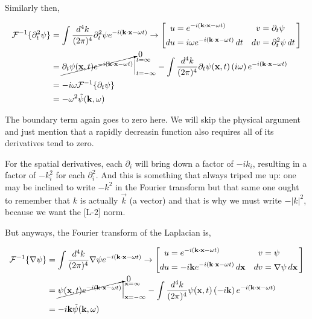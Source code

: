 Similarly then,

\begin{align*}
\mathcal{F}^{-1}\{ \partial_{t}^2 \psi \} &=
    \int \frac{d^4k}{(2\pi)^4} \partial_{t}^{2} \psi e^{-i(\boldsymbol{\mathbf{k}}\cdot\boldsymbol{\mathbf{x}} - \omega t)}
\rightarrow
\left[
    \begin{alignedat}{2}
        u  &= e^{-i(\boldsymbol{\mathbf{k}}\cdot\boldsymbol{\mathbf{x}} - \omega t)}                \quad & v  &= \partial_t \psi \\
        du &= i\omega e^{-i(\boldsymbol{\mathbf{k}}\cdot\boldsymbol{\mathbf{x}} - \omega t)} \, dt  \quad & dv &= \partial_{t}^{2} \psi \, dt
    \end{alignedat}\,
\right] \\
&= \cancelto{0}{ \partial _t \psi(\boldsymbol{\mathbf{x}}, t) e^{-i(\boldsymbol{\mathbf{k}}\cdot\boldsymbol{\mathbf{x}} - \omega t)} } \Big|_{t=-\infty}^{t=\infty}
    - \int \frac{d^4k}{(2\pi)^4} \partial_t \psi(\boldsymbol{\mathbf{x}}, t) \left(i\omega\right) e^{-i(\boldsymbol{\mathbf{k}}\cdot\boldsymbol{\mathbf{x}} - \omega t)} \\
&= -i\omega \mathcal{F}^{-1}\{ \partial_t \psi \} \\
&= - \omega^2 \tilde{\psi} (\boldsymbol{\mathbf{k}}, \omega)
\end{align*}

The boundary term again goes to zero here.
We will skip the physical argument and just mention that a rapidly decreasin function also requires all of its derivatives
tend to zero.



For the spatial derivatives, each $\partial_i$ will bring down a factor of $-i k_i$, resulting in a factor of
$- k_{i}^2$ for each $\partial_{i}^{2}$.
And this is something that always triped me up: one may be inclined to write $-k^2$ in the Fourier transform
but that same one ought to remember that $k$ is actually $\vec{k}$ (a vector) and that is why we must
write $-|k|^2$, because we want the [L-2] norm.

But anyways, the Fourier transform of the Laplacian is,

\begin{align*}
\mathcal{F}^{-1}\{ \nabla \psi \} &=
    \int \frac{d^4k}{(2\pi)^4} \nabla \psi e^{-i(\boldsymbol{\mathbf{k}}\cdot\boldsymbol{\mathbf{x}} - \omega t)}
\rightarrow
\left[
    \begin{alignedat}{2}
        u  &= e^{-i(\boldsymbol{\mathbf{k}}\cdot\boldsymbol{\mathbf{x}} - \omega t)}                          \quad & v  &= \psi \\
        du &= -i\boldsymbol{\mathbf{k}} e^{-i(\boldsymbol{\mathbf{k}}\cdot\boldsymbol{\mathbf{x}} - \omega t)} \, d\boldsymbol{\mathbf{x}}  \quad & dv &= \nabla \psi \, d\boldsymbol{\mathbf{x}}
    \end{alignedat}\,
\right] \\
&= \cancelto{0}{ \psi(\boldsymbol{\mathbf{x}}, t) e^{-i(\boldsymbol{\mathbf{k}}\cdot\boldsymbol{\mathbf{x}} - \omega t)} } \Big|_{\boldsymbol{\mathbf{x}}=-\infty}^{\boldsymbol{\mathbf{x}}=\infty}
    - \int \frac{d^4k}{(2\pi)^4} \psi(\boldsymbol{\mathbf{x}}, t) \left(-i\boldsymbol{\mathbf{k}}\right) e^{-i(\boldsymbol{\mathbf{k}}\cdot\boldsymbol{\mathbf{x}} - \omega t)} \\
&= -i\boldsymbol{\mathbf{k}} \tilde{\psi} (\boldsymbol{\mathbf{k}}, \omega)
\end{align*}


